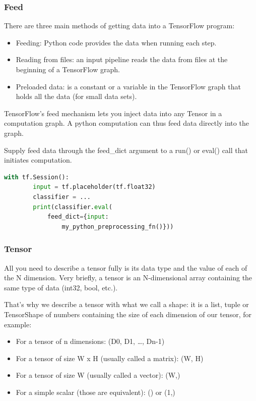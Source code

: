 \subsubsection{Feed}

There are three main methods of getting data into a TensorFlow program:

\begin{itemize}
    \item Feeding: Python code provides the data when running each step.
    \item Reading from files: an input pipeline reads the data from files at the beginning of a TensorFlow graph.
    \item Preloaded data: is a constant or a variable in the TensorFlow graph that holds all the data (for small data sets).
\end{itemize}

TensorFlow's feed mechanism lets you inject data into any Tensor in a computation graph. A python computation can thus feed data directly into the graph.

Supply feed data through the feed\_dict argument to a run() or eval() call that initiates computation.

\begin{lstlisting}[language=Python]
    with tf.Session():
        input = tf.placeholder(tf.float32)
        classifier = ...
        print(classifier.eval(
            feed_dict={input: 
                my_python_preprocessing_fn()}))
\end{lstlisting}

\subsubsection{Tensor}

All you need to describe a tensor fully is its data type and the value of each of the N dimension. Very briefly, a tensor is an N-dimensional array containing the same type of data (int32, bool, etc.).

That’s why we describe a tensor with what we call a shape: it is a list, tuple or TensorShape of numbers containing the size of each dimension of our tensor, for example:

\begin{itemize}
    \item For a tensor of n dimensions: (D0, D1, …, Dn-1)
    \item For a tensor of size W x H (usually called a matrix): (W, H)
    \item For a tensor of size W (usually called a vector): (W,)
    \item For a simple scalar (those are equivalent): () or (1,)
\end{itemize}

